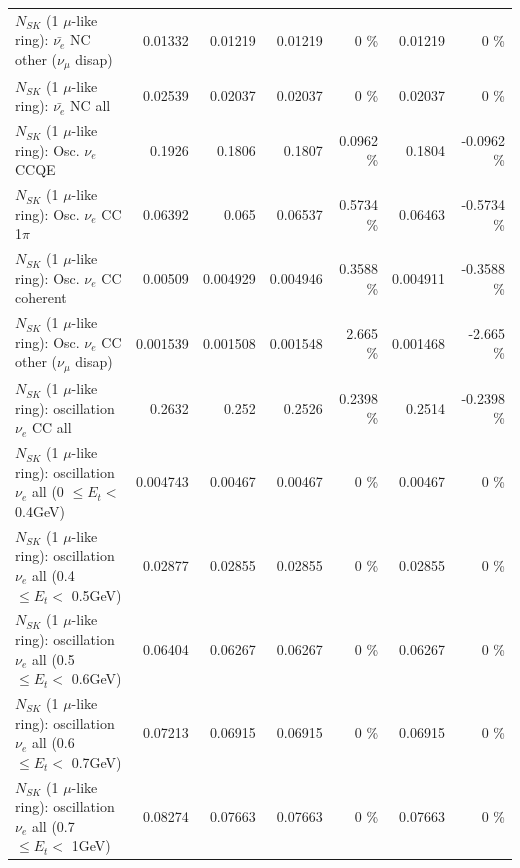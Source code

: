 \begin{table}
\begin{tabular}{| l | r | r | r  r | r  r |}
          $N_{SK}$ (1 $\mu$-like ring): $\bar{\nu_e}$ NC other ($\nu_\mu$ disap) &         0.01332 &         0.01219 &         0.01219 &        0 \%  &         0.01219 &        0 \%  \\ 
                            $N_{SK}$ (1 $\mu$-like ring): $\bar{\nu_{e}}$ NC all &         0.02539 &         0.02037 &         0.02037 &        0 \%  &         0.02037 &        0 \%  \\ 
\hline
\hline
\hline
                                 $N_{SK}$ (1 $\mu$-like ring): Osc. $\nu_e$ CCQE &          0.1926 &          0.1806 &          0.1807 &   0.0962 \%  &          0.1804 &  -0.0962 \%  \\ 
                            $N_{SK}$ (1 $\mu$-like ring): Osc. $\nu_e$ CC 1$\pi$ &         0.06392 &           0.065 &         0.06537 &   0.5734 \%  &         0.06463 &  -0.5734 \%  \\ 
                          $N_{SK}$ (1 $\mu$-like ring): Osc. $\nu_e$ CC coherent &         0.00509 &        0.004929 &        0.004946 &   0.3588 \%  &        0.004911 &  -0.3588 \%  \\ 
           $N_{SK}$ (1 $\mu$-like ring): Osc. $\nu_e$ CC other ($\nu_\mu$ disap) &        0.001539 &        0.001508 &        0.001548 &    2.665 \%  &        0.001468 &   -2.665 \%  \\ 
                        $N_{SK}$ (1 $\mu$-like ring): oscillation $\nu_e$ CC all &          0.2632 &           0.252 &          0.2526 &   0.2398 \%  &          0.2514 &  -0.2398 \%  \\ 
\hline
$N_{SK}$ (1 $\mu$-like ring): oscillation $\nu_{e}$ all (0 $\leq E_{t} <$ 0.4GeV) &        0.004743 &         0.00467 &         0.00467 &        0 \%  &         0.00467 &        0 \%  \\ 
$N_{SK}$ (1 $\mu$-like ring): oscillation $\nu_{e}$ all (0.4 $\leq E_{t} <$ 0.5GeV) &         0.02877 &         0.02855 &         0.02855 &        0 \%  &         0.02855 &        0 \%  \\ 
$N_{SK}$ (1 $\mu$-like ring): oscillation $\nu_{e}$ all (0.5 $\leq E_{t} <$ 0.6GeV) &         0.06404 &         0.06267 &         0.06267 &        0 \%  &         0.06267 &        0 \%  \\ 
$N_{SK}$ (1 $\mu$-like ring): oscillation $\nu_{e}$ all (0.6 $\leq E_{t} <$ 0.7GeV) &         0.07213 &         0.06915 &         0.06915 &        0 \%  &         0.06915 &        0 \%  \\ 
$N_{SK}$ (1 $\mu$-like ring): oscillation $\nu_{e}$ all (0.7 $\leq E_{t} <$ 1GeV) &         0.08274 &         0.07663 &         0.07663 &        0 \%  &         0.07663 &        0 \%  \\ 

\end{tabular}
\end{table}
